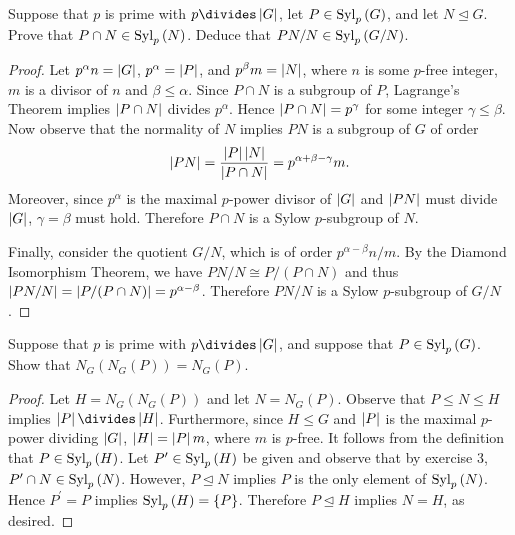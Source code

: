\documentclass[10pt]{amsart}
\begin{document}
\begin{thm}
  Suppose that $p$ is prime with $p \divides \abs{G}$, let $P \in \operatorname{Syl}_{p}\left(G\right)$, and let $N \unlhd G$.
  Prove that $P \cap N \in \operatorname{Syl}_{p}\left(N\right)$.
  Deduce that $PN/N \in \operatorname{Syl}_{p}\left(G/N\right)$.
  \begin{proof}
    Let $p^{\alpha}n = \left| G \right|$, $p^\alpha = \left| P \right|$, and $p^\beta m = \left| N \right|$, where $n$ is some $p$-free integer, $m$ is a divisor of $n$ and $\beta \leq \alpha$.
    Since $P \cap N$ is a subgroup of $P$, Lagrange's Theorem implies $\left| P \cap N \right|$ divides $p^\alpha$.
    Hence $\left| P \cap N \right| = p^\gamma$ for some integer $\gamma \leq \beta$.
    Now observe that the normality of $N$ implies $PN$ is a subgroup of $G$ of order $$\left| PN \right| = \frac{\left| P \right|\left| N \right|}{\left| P \cap N \right|} = p^{\alpha + \beta - \gamma}m.$$
    Moreover, since $p^\alpha$ is the maximal $p$-power divisor of $\left| G \right|$ and $\left| PN \right|$ must divide $\left| G \right|$, $\gamma = \beta$ must hold.
    Therefore $P \cap N$ is a Sylow $p$-subgroup of $N$.

    Finally, consider the quotient $G/N$, which is of order $p^{\alpha-\beta}n/m$.
    By the Diamond Isomorphism Theorem, we have $PN/N \cong  P/(P\cap N)$ and thus $\left| PN/N \right| =  \left| P/(P\cap N) \right| = p^{\alpha-\beta}$.
    Therefore $PN/N$ is a Sylow $p$-subgroup of $G/N$.
  \end{proof}
\end{thm}

\begin{thm}
  Suppose that $p$ is prime with $p \divides \abs{G}$, and suppose that $P \in \operatorname{Syl}_{p}\left(G\right)$.
  Show that $N_G(N_G(P)) = N_G(P)$.
  \begin{proof}
    Let $H = N_G(N_G(P))$ and let $N = N_G(P)$.
    Observe that $P \leq N \leq H$ implies $\abs{P} \divides \abs{H}$.
    Furthermore, since $H \leq G$ and $\left| P \right|$ is the maximal $p$-power dividing $\left| G \right|$, $\left| H \right| = \left| P \right|m$, where $m$ is $p$-free.
    It follows from the definition that $P \in \operatorname{Syl}_{p}\left(H\right)$.
    Let $P^\prime \in \operatorname{Syl}_{p}\left(H\right)$ be given and observe that by exercise 3, $P^\prime \cap N \in \operatorname{Syl}_{p}\left(N\right)$.
    However, $P \unlhd N$ implies $P$ is the only element of $\operatorname{Syl}_{p}\left(N\right)$.
    Hence $P^\prime = P$ implies $\operatorname{Syl}_{p}\left(H\right) = \left\{P\right\}$.
    Therefore $P \unlhd H$ implies $N = H$, as desired.
  \end{proof}
\end{thm}
\end{document}
